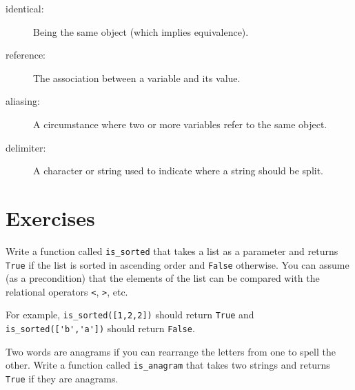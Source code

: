 \documentclass[10pt]{book}
\begin{document}
\begin{description}
\item[identical:] Being the same object (which implies equivalence).

\item[reference:] The association between a variable and its value.

\item[aliasing:] A circumstance where two or more variables refer to the same
object.

\item[delimiter:] A character or string used to indicate where a
string should be split.

\end{description}


\section{Exercises}

\begin{ex}
Write a function called \verb"is_sorted" that takes a list as a
parameter and returns {\tt True} if the list is sorted in ascending
order and {\tt False} otherwise.  You can assume (as a precondition)
that the elements of the list can be compared with the relational
operators {\tt <}, {\tt >}, etc.


For example, \verb"is_sorted([1,2,2])" should return {\tt True}
and \verb"is_sorted(['b','a'])" should return {\tt False}.
\end{ex}


\begin{ex}
\label{anagram}


Two words are anagrams if you can rearrange the letters from one
to spell the other.  Write a function called \verb"is_anagram"
that takes two strings and returns {\tt True} if they are anagrams.
\end{ex}
\end{document}
